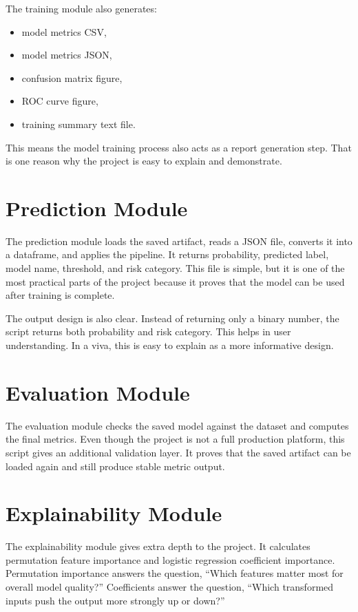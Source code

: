 \documentclass[12pt,a4paper,openany]{report}
\begin{document}
    The training module also generates:
    \begin{itemize}[leftmargin=1.4cm]
    \item model metrics CSV,
    \item model metrics JSON,
    \item confusion matrix figure,
    \item ROC curve figure,
    \item training summary text file.
    \end{itemize}

    This means the model training process also acts as a report generation step. That is one reason why the project is easy to explain and demonstrate.

    \section{Prediction Module}
    The prediction module loads the saved artifact, reads a JSON file, converts it into a dataframe, and applies the pipeline. It returns probability, predicted label, model name, threshold, and risk category. This file is simple, but it is one of the most practical parts of the project because it proves that the model can be used after training is complete.

    The output design is also clear. Instead of returning only a binary number, the script returns both probability and risk category. This helps in user understanding. In a viva, this is easy to explain as a more informative design.

    \section{Evaluation Module}
    The evaluation module checks the saved model against the dataset and computes the final metrics. Even though the project is not a full production platform, this script gives an additional validation layer. It proves that the saved artifact can be loaded again and still produce stable metric output.

    \section{Explainability Module}
    The explainability module gives extra depth to the project. It calculates permutation feature importance and logistic regression coefficient importance. Permutation importance answers the question, ``Which features matter most for overall model quality?'' Coefficients answer the question, ``Which transformed inputs push the output more strongly up or down?''
\end{document}
